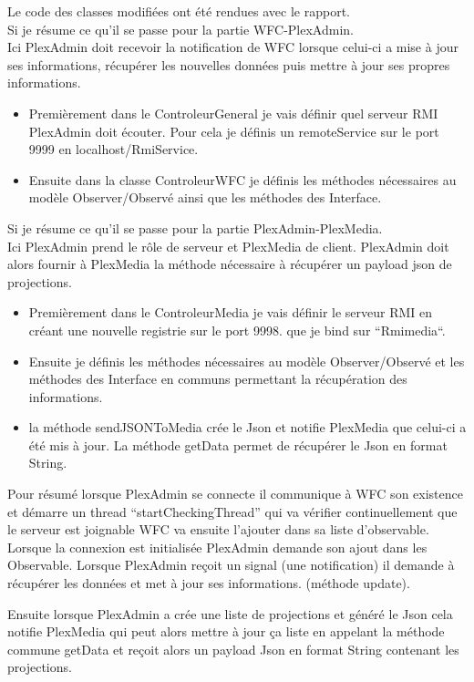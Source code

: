 \documentclass[a4paper]{article}
\begin{document}
Le code des classes modifiées ont été rendues avec le rapport.\\

Si je résume ce qu'il se passe pour la partie WFC-PlexAdmin.\\
Ici PlexAdmin doit recevoir la notification de WFC lorsque celui-ci a mise à jour ses informations, récupérer les nouvelles données puis mettre à jour ses propres informations.
\begin{itemize}
 \item Premièrement dans le ControleurGeneral je vais définir quel serveur RMI PlexAdmin doit écouter. Pour cela je définis un remoteService sur le port 9999
 en localhost/RmiService.
 \item Ensuite dans la classe ControleurWFC je définis les méthodes nécessaires au modèle Observer/Observé ainsi que 
 les méthodes des Interface.
\end{itemize}

Si je résume ce qu'il se passe pour la partie PlexAdmin-PlexMedia.\\
Ici PlexAdmin prend le rôle de serveur et PlexMedia de client. PlexAdmin doit alors fournir à PlexMedia la méthode nécessaire à récupérer un payload json de projections.
\begin{itemize}
 \item Premièrement dans le ControleurMedia je vais définir le serveur RMI en créant une nouvelle registrie sur le port 9998.
 que je bind sur ``Rmimedia``.
 \item Ensuite je définis les méthodes nécessaires au modèle Observer/Observé et les méthodes des Interface en communs permettant la récupération des informations.
 \item la méthode sendJSONToMedia crée le Json et notifie PlexMedia que celui-ci a été mis à jour. La méthode getData permet de récupérer le Json en format String.
\end{itemize}

Pour résumé lorsque PlexAdmin se connecte il communique à WFC son existence et démarre un thread ``startCheckingThread'' qui va vérifier continuellement que le serveur est joignable
WFC va ensuite l'ajouter dans sa liste d'observable. Lorsque la connexion est initialisée PlexAdmin demande son ajout dans les Observable. Lorsque PlexAdmin reçoit un signal (une notification) il demande à récupérer les données et met à jour ses informations. (méthode update).

Ensuite lorsque PlexAdmin a crée une liste de projections et généré le Json cela notifie PlexMedia qui peut alors mettre à jour ça liste en appelant la méthode commune getData et reçoit alors un payload Json en format String contenant les projections.
\end{document}
